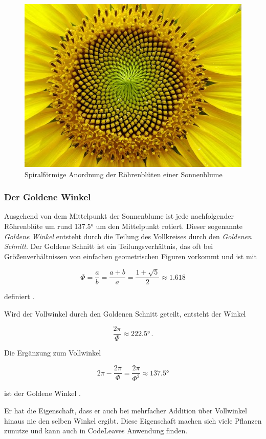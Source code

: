 \begin{figure}[htb]
  \includegraphics[width=.5\textwidth]{figures/sunflower-seeds}
  \caption{Spiralförmige Anordnung der Röhrenblüten einer Sonnenblume \cite{blender2017howto}}
  \label{fig:sunflower-seeds}
\end{figure}

\subsubsection*{Der Goldene Winkel}
Ausgehend von dem Mittelpunkt der Sonnenblume ist jede nachfolgender Röhrenblüte um rund \ang{137.5} um den Mittelpunkt rotiert. Dieser sogenannte \textit{Goldene Winkel} entsteht durch die Teilung des Vollkreises durch den \textit{Goldenen Schnitt}. Der Goldene Schnitt ist ein Teilungsverhältnis, das oft bei Größenverhältnissen von einfachen geometrischen Figuren vorkommt und ist mit

\begin{equation}
  \Phi = \frac{a}{b} = \frac{a + b}{a} = \frac{1 + \sqrt{5}}{2} \approx 1.618
\end{equation}

\noindent definiert \cite{wolfram2017golden}.

Wird der Vollwinkel durch den Goldenen Schnitt geteilt, entsteht der Winkel

\begin{equation}
  \frac{2\pi}{\Phi} \approx \ang{222.5} \,.
\end{equation}

Die Ergänzung zum Vollwinkel

\begin{equation}
  2\pi - \frac{2\pi}{\Phi} = \frac{2\pi}{\Phi^2} \approx \ang{137.5}
\end{equation}

\noindent ist der Goldene Winkel \cite{wolfram2017golden}.

Er hat die Eigenschaft, dass er auch bei mehrfacher Addition über Vollwinkel hinaus nie den selben Winkel ergibt. Diese Eigenschaft machen sich viele Pflanzen zunutze und kann auch in CodeLeaves Anwendung finden.

